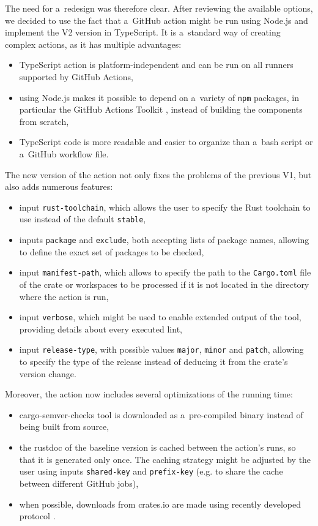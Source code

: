 \documentclass[licencjacka,en]{pracamgr}
\begin{document}
The need for a~redesign was therefore clear. After reviewing the available options,
we decided to use the fact that a~GitHub action might
be run using Node.js and implement the V2 version in TypeScript. It is a~standard way
of creating complex actions, as it has multiple advantages:
\begin{itemize}
	\item TypeScript action is platform-independent and can be run on all runners supported
		by GitHub Actions,
	\item using Node.js makes it possible to depend on a~variety of \texttt{npm} packages,
		in particular the GitHub Actions Toolkit \cite{github_actions_toolkit}, instead of building
		the components from scratch,
	\item TypeScript code is more readable and easier to organize than a~bash script
		or a~GitHub workflow file.
\end{itemize}
The new version of the action not only fixes the problems of the previous V1, but also
adds numerous features:
\begin{itemize}
	\item input \texttt{rust-toolchain}, which allows the user to specify the Rust toolchain
		to use instead of the default \texttt{stable},
	\item inputs \texttt{package} and \texttt{exclude}, both accepting lists of package names,
		allowing to define the exact set of packages to be checked,
	\item input \texttt{manifest-path}, which allows to specify the path to the \texttt{Cargo.toml}
		file of the crate or workspaces to be processed if it is not located in the directory where
		the action is run,
	\item input \texttt{verbose}, which might be used to enable extended output of the tool,
		providing details about every executed lint,
	\item input \texttt{release-type}, with possible values \texttt{major}, \texttt{minor}
		and \texttt{patch}, allowing to specify the type of the release instead of deducing it from
		the crate's version change.
\end{itemize}
Moreover, the action now includes several optimizations of the running time:
\begin{itemize}
	\item cargo-semver-checks tool is downloaded as a~pre-compiled binary instead of being built
		from source,
	\item the rustdoc of the baseline version is cached between the action's runs, so that
		it is generated only once. The caching strategy might be adjusted by the user using inputs
		\texttt{shared-key} and \texttt{prefix-key} (e.g. to share the cache between different
		GitHub jobs),
	\item when possible, downloads from crates.io are made using recently developed 
		protocol \cite{crates_io_sparse_protocol}.
\end{itemize}
\end{document}
